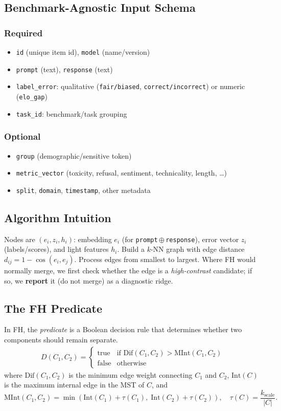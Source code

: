 \documentclass[11pt]{article}
\begin{document}
\subsection{Benchmark-Agnostic Input Schema}\label{sec:schema}
\subsubsection*{Required}
\begin{itemize}[nosep]
  \item \texttt{id} (unique item id), \texttt{model} (name/version)
  \item \texttt{prompt} (text), \texttt{response} (text)
  \item \texttt{label\_error}: qualitative (\texttt{fair/biased}, \texttt{correct/incorrect}) or numeric (\texttt{elo\_gap})
  \item \texttt{task\_id}: benchmark/task grouping
\end{itemize}
\subsubsection*{Optional}
\begin{itemize}[nosep]
  \item \texttt{group} (demographic/sensitive token)
  \item \texttt{metric\_vector} (toxicity, refusal, sentiment, technicality, length, \dots)
  \item \texttt{split}, \texttt{domain}, \texttt{timestamp}, other metadata
\end{itemize}

\subsection{Algorithm Intuition}
Nodes are $(e_i, z_i, h_i)$: embedding $e_i$ (for \texttt{prompt}\,$\oplus$\,\texttt{response}), error vector $z_i$ (labels/scores), and light features $h_i$. Build a $k$-NN graph with edge distance $d_{ij}=1-\cos(e_i,e_j)$. Process edges from smallest to largest. Where FH would normally merge, we first check whether the edge is a \emph{high-contrast} candidate; if so, we \textbf{report} it (do not merge) as a diagnostic ridge.

\subsection{The FH Predicate}\label{sec:predicate}
In FH, the \emph{predicate} is a Boolean decision rule that determines whether two components should remain separate.
\begin{align*}
D(C_1,C_2) =
\begin{cases}
\text{true} & \text{if } \mathrm{Dif}(C_1,C_2) > \mathrm{MInt}(C_1,C_2) \\
\text{false} & \text{otherwise}
\end{cases}
\end{align*}
where $\mathrm{Dif}(C_1,C_2)$ is the minimum edge weight connecting $C_1$ and $C_2$, $\mathrm{Int}(C)$ is the maximum internal edge in the MST of $C$, and
\[\mathrm{MInt}(C_1,C_2) = \min\left(\mathrm{Int}(C_1)+\tau(C_1),\; \mathrm{Int}(C_2)+\tau(C_2)\right), \quad \tau(C)=\frac{k_{\mathrm{scale}}}{|C|}.\]
\end{document}
